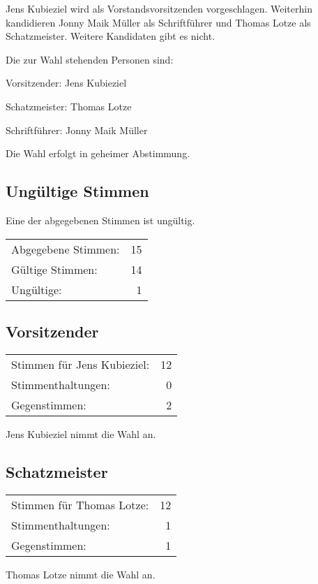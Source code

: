 \documentclass[DIV=calc,parksip=half*]{scrartcl}
\newcommand{\qbi}{Jens Kubieziel}
\newcommand{\jonny}{Jonny Maik Müller}
\newcommand{\thomas}{Thomas Lotze}
\begin{document}
\qbi{} wird als Vorstandsvorsitzenden vorgeschlagen. Weiterhin kandidieren
\jonny{} als Schriftführer und \thomas{} als Schatzmeister. Weitere Kandidaten
gibt es nicht.

Die zur Wahl stehenden Personen sind:
\begin{compactenum}
\item Vorsitzender: \qbi{}
\item Schatzmeister: \thomas{}
\item Schriftführer: \jonny{}
\end{compactenum}

Die Wahl erfolgt in geheimer Abstimmung.

\subsection*{Ungültige Stimmen}

Eine der abgegebenen Stimmen ist ungültig.

\begin{tabularx}{\linewidth}{Xr}
Abgegebene Stimmen: & 15 \\
  Gültige Stimmen: & 14 \\
  Ungültige: & 1\\
\end{tabularx}

\subsection{Vorsitzender}
\begin{tabularx}{\linewidth}{Xr}
Stimmen für \qbi{}: & 12 \\
  Stimmenthaltungen: & 0 \\
  Gegenstimmen: & 2\\
\end{tabularx}
\qbi{} nimmt die Wahl an.

\subsection{Schatzmeister}
\begin{tabularx}{\linewidth}{Xr}
Stimmen für \thomas{}: & 12\\
Stimmenthaltungen: & 1 \\
Gegenstimmen: & 1
\end{tabularx}
\thomas{} nimmt die Wahl an.
\end{document}
